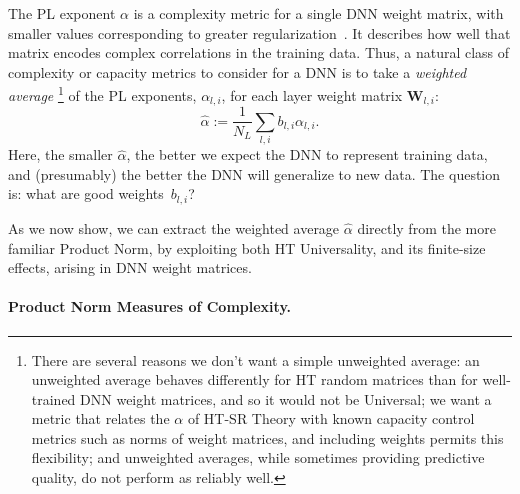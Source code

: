 The PL exponent $\alpha$ is a complexity metric for a single DNN weight matrix, with smaller values corresponding to greater regularization~\cite{MM18_TR}.
It describes how well that matrix encodes complex correlations in the training data.
Thus, a natural class of complexity or capacity metrics to consider for a DNN is to take a \emph{weighted average}%
\footnote{There are several reasons we don't want a simple unweighted average: an unweighted average behaves differently for HT random matrices than for well-trained DNN weight matrices, and so it would not be Universal; we want a metric that relates the $\alpha$ of HT-SR Theory with known capacity control metrics such as norms of weight matrices, and including weights permits this flexibility; and unweighted averages, while sometimes providing predictive quality, do not perform as reliably well. }
of the PL exponents, $\alpha_{l,i}$, for each layer weight matrix $\mathbf{W}_{l,i}$:
\begin{equation}
\hat{\alpha}:=\dfrac{1}{N_L}\sum_{l,i}b_{l,i}\alpha_{l,i}  .
\label{eqn:alpha_hat_generic}
\end{equation}
Here, the smaller $\hat{\alpha}$, the better we expect the DNN to represent training data, and (presumably) the better the DNN will generalize to new data.
The question is: what are good weights~$b_{l,i}$?

As we now show, we can extract the weighted average $\hat{\alpha}$ directly from the more familiar Product Norm, by exploiting both HT Universality, and its finite-size effects, arising
in DNN weight matrices.




\paragraph{Product Norm Measures of Complexity.} 


